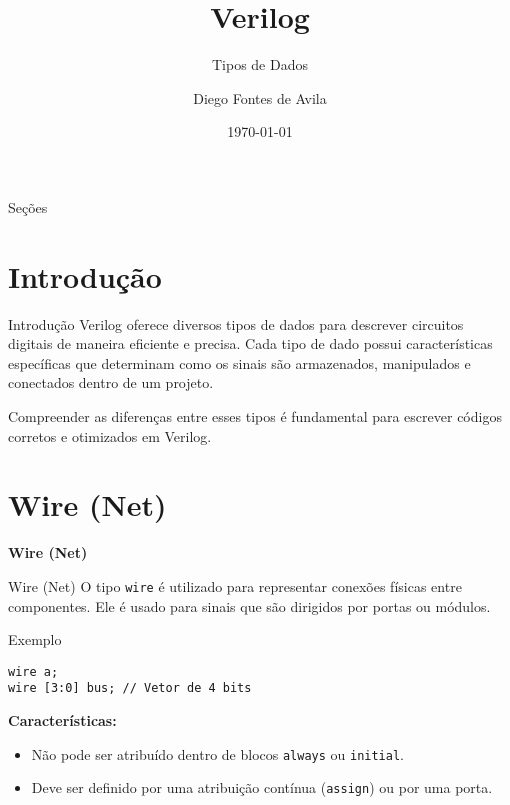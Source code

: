 \documentclass[aspectratio=169,xcolor=dvipsnames]{beamer}
\title{Verilog}
\subtitle{Tipos de Dados}
\author{Diego Fontes de Avila}
\institute
{
    Poliware \\
    Escola Politécnica da Universidade de São Paulo
}
\date{\today}
\begin{document}
\begin{frame}
    \titlepage
\end{frame}

\begin{frame}{Seções}
    \tableofcontents
\end{frame}

\section{Introdução}

\begin{frame}{Introdução}
    Verilog oferece diversos tipos de dados para descrever circuitos digitais de maneira eficiente e precisa. Cada tipo de dado possui características específicas que determinam como os sinais são armazenados, manipulados e conectados dentro de um projeto.

    Compreender as diferenças entre esses tipos é fundamental para escrever códigos corretos e otimizados em Verilog.
\end{frame}

\section{Wire (Net)}

\begin{frame}
    \Huge{\centerline{\textbf{Wire (Net)}}}
\end{frame}

\begin{frame}[fragile]{Wire (Net)}
O tipo \texttt{wire} é utilizado para representar conexões físicas entre componentes. Ele é usado para sinais que são dirigidos por portas ou módulos.

\begin{block}{Exemplo}
\begin{verbatim}
wire a;
wire [3:0] bus; // Vetor de 4 bits
\end{verbatim}
\end{block}

\textbf{Características:}
\begin{itemize}
    \item Não pode ser atribuído dentro de blocos \texttt{always} ou \texttt{initial}.
    \item Deve ser definido por uma atribuição contínua (\texttt{assign}) ou por uma porta.
\end{itemize}
\end{frame}
\end{document}
